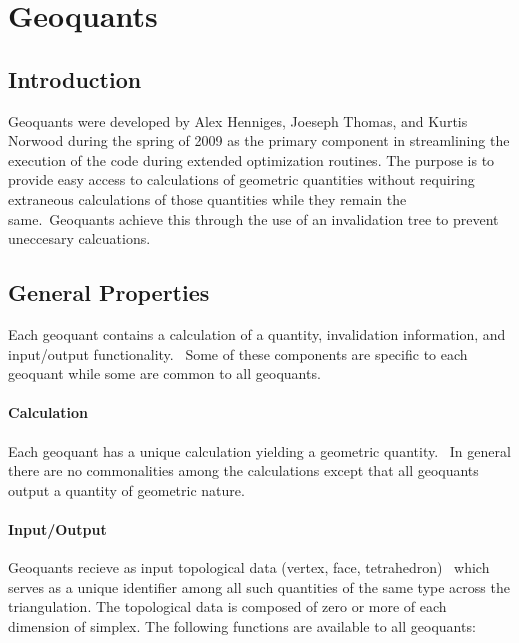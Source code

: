                       


\chapter{Geoquants}

\section{Introduction}

Geoquants were developed by Alex Henniges, Joeseph Thomas, and Kurtis
Norwood during the spring of 2009 as the primary component in streamlining
the execution of the code during extended optimization routines. The purpose
is to provide easy access to calculations of geometric quantities without
requiring extraneous calculations of those quantities while they remain the
same.\ Geoquants achieve this through the use of an invalidation tree to
prevent uneccesary calcuations.\bigskip

\section{General Properties}

Each geoquant contains a calculation of a quantity, invalidation
information, and input/output functionality. \ Some of these components are
specific to each geoquant while some are common to all geoquants.

\subsubsection{Calculation}

Each geoquant has a unique calculation yielding a geometric quantity. \ In
general there are no commonalities among the calculations except that all
geoquants output a quantity of geometric nature. \ 

\subsubsection{Input/Output}

Geoquants recieve as input topological data (vertex, face, tetrahedron) \
which serves as a unique identifier among all such quantities of the same
type across the triangulation. The topological data is composed of zero or
more of each dimension of simplex. The following functions are available to
all geoquants:

